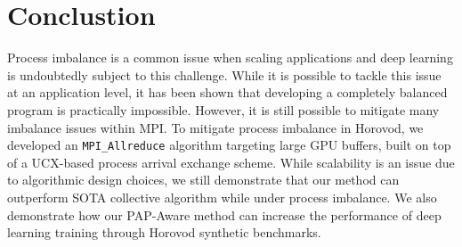 

\section{Conclustion}
Process imbalance is a common issue when scaling applications and deep learning is undoubtedly subject to this challenge.
While it is possible to tackle this issue at an application level, it has been shown that developing a completely balanced program is practically impossible.
However, it is still possible to mitigate many imbalance issues within \gls{MPI}.
To mitigate process imbalance in Horovod, we developed an \texttt{MPI\_Allreduce} algorithm targeting large \gls{GPU} buffers, built on top of a \gls{UCX}-based process arrival exchange scheme.  
While scalability is an issue due to algorithmic design choices, we still demonstrate that our method can outperform \gls{SOTA} collective algorithm while under process imbalance.
We also demonstrate how our \gls{PAP}-Aware method can increase the performance of deep learning training through Horovod synthetic benchmarks.
